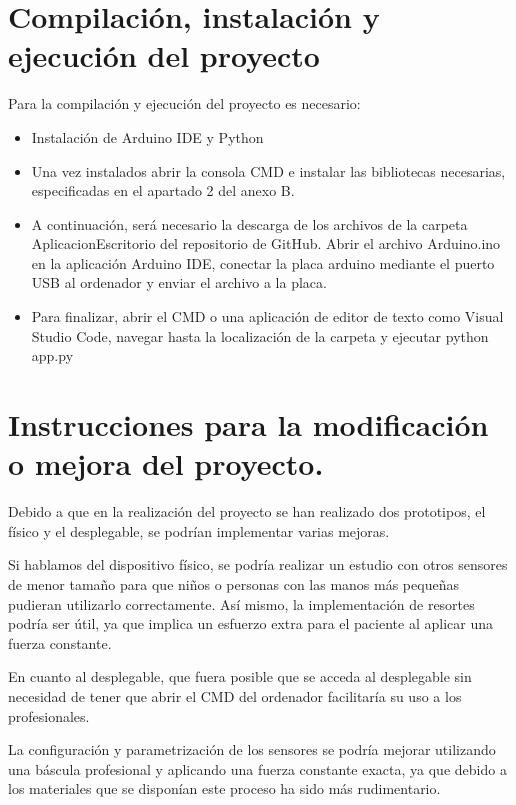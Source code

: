 \section{Compilación, instalación y ejecución del proyecto}
Para la compilación y ejecución del proyecto es necesario: 
\begin{itemize}
    \item Instalación de Arduino IDE y Python
    \item Una vez instalados abrir la consola CMD e instalar las bibliotecas necesarias, especificadas en el apartado 2 del anexo B. 
    \item A continuación, será necesario la descarga de los archivos de la carpeta AplicacionEscritorio del repositorio de GitHub. Abrir el archivo Arduino.ino en la aplicación Arduino IDE, conectar la placa arduino mediante el puerto USB al ordenador y enviar el archivo a la placa. 
    \item Para finalizar, abrir el CMD o una aplicación de editor de texto como Visual Studio Code, navegar hasta la localización de la carpeta y ejecutar python app.py 
\end{itemize}

\section{Instrucciones para la modificación o mejora del proyecto.}

Debido a que en la realización del proyecto se han realizado dos prototipos, el físico y el desplegable, se podrían implementar varias mejoras.

Si hablamos del dispositivo físico, se podría realizar un estudio con otros sensores de menor tamaño para que niños o personas con las manos más pequeñas pudieran utilizarlo correctamente. Así mismo, la implementación de resortes podría ser útil, ya que implica un esfuerzo extra para el paciente al aplicar una fuerza constante. 

En cuanto al desplegable, que fuera posible que se acceda al desplegable sin necesidad de tener que abrir el CMD del ordenador facilitaría su uso a los profesionales.

La configuración y parametrización de los sensores se podría mejorar utilizando una báscula profesional y aplicando una fuerza constante exacta, ya que debido a los materiales que se disponían este proceso ha sido más rudimentario.